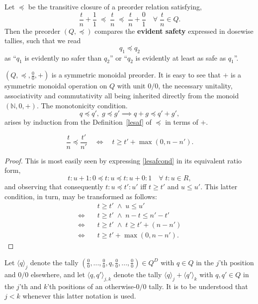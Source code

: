 \documentclass{article}
\newcommand{\N}{\mathbb{N}}
\begin{document}
\begin{defn}\label{lesaf}
  Let $\preceq$ be the transitive closure of a preorder relation satisfying,
  \begin{equation}
  \frac{t}{n}\!+\!\frac{1}{1} \;\preceq\; \frac{t}{n} \;\preceq\; \frac{t}{n}\!+\!\frac{0}{1} \quad \forall\; \frac{t}{n} \in Q. \label{lesafcond}
  \end{equation}
  Then the preorder $(Q,\preceq)$ compares the \textbf{evident safety} expressed in dosewise tallies, such that we read
  $$
  q_1 \preceq q_2
  $$
  as ``$q_1$ is evidently no safer than $q_2$'' or ``$q_2$ is evidently at least as safe as $q_1$''.
\end{defn}

\begin{fact}
  $(Q,\preceq,\frac{0}{0},+)$ is a symmetric monoidal preorder.  It is easy to see that $+$ is a symmetric monoidal operation on $Q$ with unit $0/0$, the necessary unitality, associativity and commutativity all being inherited directly from the monoid $(\N,0,+)$.  The monotonicity condition.
  $$
  q \preceq q',\; g \preceq g' \implies q + g \preceq q' + g',
  $$
  arises by induction from the Definition~\ref{lesaf} of $\preceq$ in terms of $+$.
\end{fact}

\begin{fact}
  $$
  \frac{t}{n} \preceq \frac{t'}{n'} \quad \iff \quad t \ge t' + \max(0,n-n').
  $$
\end{fact}
\begin{proof}
  This is most easily seen by expressing \eqref{lesafcond} in its equivalent ratio form,
  $$
  t\!:\!u + 1\!:\!0 \preceq t\!:\!u \preceq t\!:\!u + 0\!:\!1 \quad \forall\; t\!:\!u \in R,
  $$
  and observing that consequently $t\!:\!u \preceq t'\!:\!u'$ iff $t \ge t'$ and $u \le u'$.  This latter condition, in turn, may be transformed as follows:
  \begin{align*}
    & t \ge t' \;\wedge\; u \le u' \\
    \iff\quad & t \ge t' \;\wedge\; n-t \le n'-t' \\
    \iff\quad & t \ge t' \;\wedge\; t \ge t' + (n-n') \\
    \iff\quad & t \ge t' + \max(0,n-n').
  \end{align*}
\end{proof}

\begin{nota}
  Let $\langle q \rangle_j$ denote the tally $(\frac{0}{0},...,\frac{0}{0},q,\frac{0}{0},...,\frac{0}{0}) \in Q^D$ with $q \in Q$ in the $j$'th position and $0/0$ elsewhere, and let $\langle q, q' \rangle_{j,k}$ denote the tally $\langle q \rangle_j + \langle q' \rangle_k$ with $q, q' \in Q$ in the $j$'th and $k$'th positions of an otherwise-$0/0$ tally.  It is to be understood that $j < k$ whenever this latter notation is used.
\end{nota}
\end{document}
